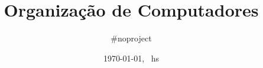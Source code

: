 \documentclass[10pt]{article}
\begin{document}
\footnotesize
\title{Organização de Computadores}
\author{\#noproject}
\date{\today, \currenttime\ hs}
\maketitle
















\end{document}
